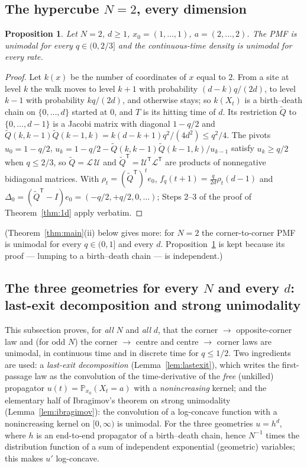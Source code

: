 \documentclass[11pt,a4paper]{article}
\newtheorem{proposition}[theorem]{Proposition}
\theoremstyle{definition}
\newcommand{\Prob}{\mathbb P}
\newcommand{\T}{^{\mathsf T}}
\begin{document}
\subsection{The hypercube $N=2$, every dimension}

\begin{proposition}\label{prop:hypercube}
Let $N=2$, $d\ge1$, $x_0=(1,\dots,1)$, $a=(2,\dots,2)$. The PMF is unimodal for every $q\in(0,2/3]$ and the continuous-time density is unimodal for every rate.
\end{proposition}
\begin{proof}
Let $k(x)$ be the number of coordinates of $x$ equal to $2$. From a site at level $k$ the walk moves to level $k+1$ with probability $(d-k)q/(2d)$, to level $k-1$ with probability $kq/(2d)$, and otherwise stays; so $k(X_t)$ is a birth--death chain on $\{0,\dots,d\}$ started at $0$, and $T$ is its hitting time of $d$. Its restriction $\tilde Q$ to $\{0,\dots,d-1\}$ is a Jacobi matrix with diagonal $1-q/2$ and $\tilde Q(k,k-1)\tilde Q(k-1,k)=k(d-k+1)q^2/(4d^2)\le q^2/4$. The pivots $u_0=1-q/2$, $u_k=1-q/2-\tilde Q(k,k-1)\tilde Q(k-1,k)/u_{k-1}$ satisfy $u_k\ge q/2$ when $q\le2/3$, so $\tilde Q=\mathcal L\,\mathcal U$ and $\tilde Q\T=\mathcal U\T\mathcal L\T$ are products of nonnegative bidiagonal matrices. With $\rho_t=(\tilde Q\T)^te_0$, $f_q(t+1)=\frac q{2d}\rho_t(d-1)$ and $\Delta_0=(\tilde Q\T-I)e_0=(-q/2,+q/2,0,\dots)$; Steps 2--3 of the proof of Theorem~\ref{thm:1d} apply verbatim.
\end{proof}

(Theorem~\ref{thm:main}(ii) below gives more: for $N=2$ the corner-to-corner PMF is unimodal for every $q\in(0,1]$ and every $d$. Proposition~\ref{prop:hypercube} is kept because its proof --- lumping to a birth--death chain --- is independent.)

\subsection{The three geometries for every $N$ and every $d$: last-exit decomposition and strong unimodality}\label{sec:lastexit}

This subsection proves, for \emph{all} $N$ and \emph{all} $d$, that the corner $\to$ opposite-corner law and (for odd $N$) the corner $\to$ centre and centre $\to$ corner laws are unimodal, in continuous time and in discrete time for $q\le1/2$. Two ingredients are used: a \emph{last-exit decomposition} (Lemma~\ref{lem:lastexit}), which writes the first-passage law as the convolution of the time-derivative of the \emph{free} (unkilled) propagator $u(t)=\Prob_{x_0}(X_t=a)$ with a \emph{nonincreasing} kernel; and the elementary half of Ibragimov's theorem on strong unimodality (Lemma~\ref{lem:ibragimov}): the convolution of a log-concave function with a nonincreasing kernel on $[0,\infty)$ is unimodal. For the three geometries $u=h^d$, where $h$ is an end-to-end propagator of a birth--death chain, hence $N^{-1}$ times the distribution function of a sum of independent exponential (geometric) variables; this makes $u'$ log-concave.
\end{document}
